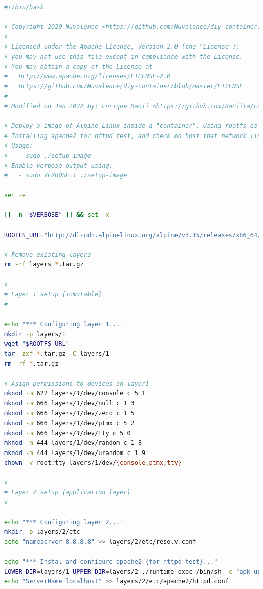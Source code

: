 \documentclass[a4paper, oneside, 12pt]{book}
\begin{document}
	\begin{lstlisting}[language=bash, caption={Creación de imagen para contenedor utilizando Alpine y union mounts}]
#!/bin/bash

# Copyright 2020 Nuvalence <https://github.com/Nuvalence/diy-container.git>
# 
# Licensed under the Apache License, Version 2.0 (the "License");
# you may not use this file except in compliance with the License.
# You may obtain a copy of the License at
#   http://www.apache.org/licenses/LICENSE-2.0
#   https://github.com/Nuvalence/diy-container/blob/master/LICENSE
#
# Modified on Jan 2022 by: Enrique Ranii <https://github.com/Raniita/container-alpine.git>

# Deploy a image of Alpine Linux inside a "container". Using rootfs as Union Filesystem
# Installing apache2 for httpd test, and check on host that network link is enabled
# Usage:
#   - sudo ./setup-image
# Enable verbose output using:
#   - sudo VERBOSE=1 ./setup-image

set -e

[[ -n "$VERBOSE" ]] && set -x

ROOTFS_URL="http://dl-cdn.alpinelinux.org/alpine/v3.15/releases/x86_64/alpine-minirootfs-3.15.0-x86_64.tar.gz"

# Remove existing layers
rm -rf layers *.tar.gz

#
# Layer 1 setup {inmutable}
#

echo "*** Configuring layer 1..."
mkdir -p layers/1
wget "$ROOTFS_URL"
tar -zxf *.tar.gz -C layers/1
rm -rf *.tar.gz

# Asign permissions to devices on layer1
mknod -m 622 layers/1/dev/console c 5 1
mknod -m 666 layers/1/dev/null c 1 3
mknod -m 666 layers/1/dev/zero c 1 5
mknod -m 666 layers/1/dev/ptmx c 5 2
mknod -m 666 layers/1/dev/tty c 5 0
mknod -m 444 layers/1/dev/random c 1 8
mknod -m 444 layers/1/dev/urandom c 1 9
chown -v root:tty layers/1/dev/{console,ptmx,tty}

#
# Layer 2 setup {application layer}
#

echo "*** Configuring layer 2..."
mkdir -p layers/2/etc
echo "nameserver 8.8.8.8" >> layers/2/etc/resolv.conf

echo "*** Instal and configure apache2 {for httpd test}..."
LOWER_DIR=layers/1 UPPER_DIR=layers/2 ./runtime-exec /bin/sh -c "apk update && apk add apache2"
echo "ServerName localhost" >> layers/2/etc/apache2/httpd.conf
	\end{lstlisting}
	
	\pagebreak
	
\end{document}
